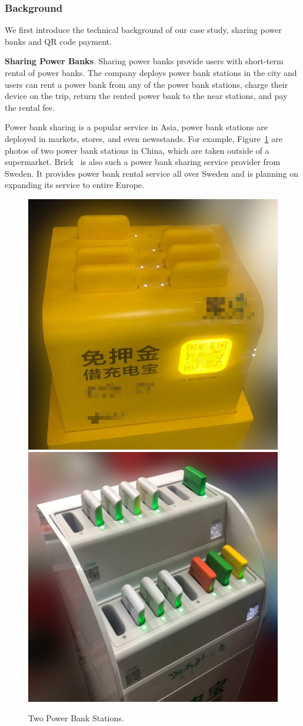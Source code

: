 \subsubsection{Background}

We first introduce the technical background of our case study, sharing power
banks and QR code payment.

\textbf{Sharing Power Banks}.  Sharing power banks provide users with short-term
rental of power banks.  The company deploys power bank stations in the city and
users can rent a power bank from any of the power bank stations, charge their
device on the trip, return the rented power bank to the near stations, and pay
the rental fee.

Power bank sharing is a popular service in Asia, power bank stations are deployed
in markets, stores, and even newsstands. For example, Figure~\ref{fig:PBS_products} are photos
of two power bank stations in China, which are taken outside of a supermarket. Brick~\cite{Brick} is also such a power bank sharing service provider from
Sweden. It provides power bank rental service all over Sweden and is planning on expanding its
service to entire Europe.
\begin{figure}[t]
	\centering
	\includegraphics[width=.45 \linewidth, height=.45 \linewidth]{./Figs/PBS_mt.png}
	\includegraphics[width=.45 \linewidth, height=.45 \linewidth]{./Figs/PBS_xd.png}
	\caption{Two Power Bank Stations.}
	\label{fig:PBS_products}
\end{figure}

